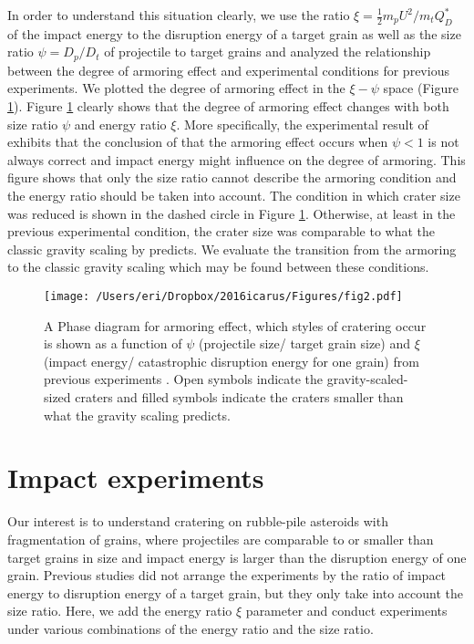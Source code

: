 \documentclass[3p,authoryear]{elsarticle}
\begin{document}
In order to understand this situation clearly, we use the ratio  $\xi =\frac{1}{2}m_pU^2/m_tQ_D^*$ of the impact energy to the disruption energy of a target grain as well as the size ratio $\psi=D_p/D_t$ of projectile to target grains and analyzed the relationship between the degree of armoring effect and experimental conditions for previous experiments. We plotted the degree of armoring effect in the $\xi - \psi$ space (Figure \ref{phase}). Figure \ref{phase} clearly shows that the degree of armoring effect changes with both size ratio $\psi$ and energy ratio $\xi$.
More specifically, the experimental result of \citet{holsapple2014} exhibits that the conclusion of \citet{guettler2012} that the armoring effect occurs when $\psi<1$ is not always correct and impact energy might influence on the degree of armoring.
This figure shows that only the size ratio cannot describe the armoring condition and the energy ratio should be taken into account.
The condition in which crater size was reduced is shown in the dashed circle in Figure \ref{phase}. Otherwise, at least in the previous experimental condition, the crater size was comparable to what the classic gravity scaling by \citet{holsapple1993} predicts.
We evaluate the transition from the armoring to the classic gravity scaling which may be found between these conditions.
\begin{figure}[htbp]
\begin{center}
	\texttt{[image: /Users/eri/Dropbox/2016icarus/Figures/fig2.pdf]}
	\caption{A Phase diagram for armoring effect, which styles of cratering occur is shown as a function of $\psi$ (projectile size/ target grain size) and $\xi$ (impact energy/ catastrophic disruption energy for one grain) from previous experiments \citep{cintala1999,guettler2012,holsapple2014}. Open symbols indicate the gravity-scaled-sized craters \cite{holsapple1993} and filled symbols indicate the craters smaller than what the gravity scaling predicts.}
	\label{phase}
\end{center}
\end{figure}

 \section{Impact experiments} \label{sec:experiment}
Our interest is to understand cratering on rubble-pile asteroids with fragmentation of grains, where projectiles are comparable to or smaller than target grains in size and impact energy is larger than the disruption energy of one grain.
Previous studies did not arrange the experiments by the ratio of impact energy to disruption energy of a target grain, but they only take into account the size ratio.
Here, we add the energy ratio $\xi$ parameter and conduct experiments under various combinations of the energy ratio and the size ratio.
\end{document}
